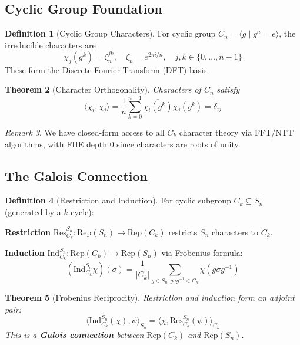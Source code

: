 \documentclass[11pt]{article}
\newtheorem{theorem}{Theorem}[section]
\theoremstyle{definition}
\newtheorem{definition}[theorem]{Definition}
\theoremstyle{remark}
\newtheorem{remark}[theorem]{Remark}
\begin{document}
\subsection{Cyclic Group Foundation}

\begin{definition}[Cyclic Group Characters]
For cyclic group $C_n = \langle g \mid g^n = e \rangle$, the irreducible characters are
\begin{equation}
\chi_j(g^k) = \zeta_n^{jk}, \quad \zeta_n = e^{2\pi i/n}, \quad j,k \in \{0,\ldots,n-1\}
\end{equation}
These form the Discrete Fourier Transform (DFT) basis.
\end{definition}

\begin{theorem}[Character Orthogonality]
Characters of $C_n$ satisfy
\begin{equation}
\langle \chi_i, \chi_j \rangle = \frac{1}{n} \sum_{k=0}^{n-1} \overline{\chi_i(g^k)} \chi_j(g^k) = \delta_{ij}
\end{equation}
\end{theorem}

\begin{remark}
We have closed-form access to all $C_k$ character theory via FFT/NTT algorithms, with FHE depth 0 since characters are roots of unity.
\end{remark}

\subsection{The Galois Connection}

\begin{definition}[Restriction and Induction]\label{def:restriction_induction}
For cyclic subgroup $C_k \subseteq S_n$ (generated by a $k$-cycle):

\textbf{Restriction} $\text{Res}^{S_n}_{C_k}: \text{Rep}(S_n) \to \text{Rep}(C_k)$ restricts $S_n$ characters to $C_k$.

\textbf{Induction} $\text{Ind}_{C_k}^{S_n}: \text{Rep}(C_k) \to \text{Rep}(S_n)$ via Frobenius formula:
\begin{equation}
(\text{Ind}_{C_k}^{S_n} \chi)(\sigma) = \frac{1}{|C_k|} \sum_{g \in S_n : g\sigma g^{-1} \in C_k} \chi(g\sigma g^{-1})
\end{equation}
\end{definition}

\begin{theorem}[Frobenius Reciprocity]\label{thm:frobenius}
Restriction and induction form an adjoint pair:
\begin{equation}
\langle \text{Ind}_{C_k}^{S_n}(\chi), \psi \rangle_{S_n} = \langle \chi, \text{Res}^{S_n}_{C_k}(\psi) \rangle_{C_k}
\end{equation}
This is a \textbf{Galois connection} between $\text{Rep}(C_k)$ and $\text{Rep}(S_n)$.
\end{theorem}
\end{document}
